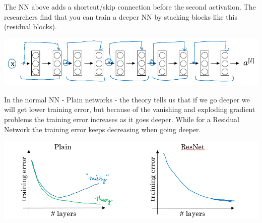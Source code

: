 \documentclass{article}
\begin{document}
\noindent The NN above adds a shortcut/skip connection before the second activation. The researchers find that you can train a deeper NN by stacking blocks like this (residual blocks).

\begin{center}
\includegraphics[scale=0.4]{./images/resnet_blocks.png}
\end{center}

\noindent In the normal NN - Plain networks - the theory tells us that if we go deeper we will get lower training error, but because of the vanishing and exploding gradient problems the training error increases as it goes deeper. While for a Residual Network the training error keeps decreasing when going deeper.

\begin{center}
\includegraphics[scale=0.4]{./images/resnet_training_error.png}
\end{center}

\printindex
\end{document}
